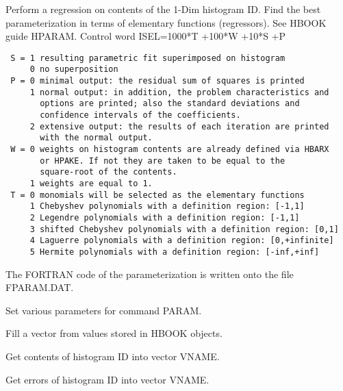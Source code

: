 \BEGARG
{}
\ENDARG
\BEGTEXT
Perform a regression on contents of the 1-Dim histogram ID.
Find the best parameterization in terms of elementary functions
(regressors). See HBOOK guide HPARAM.
Control word ISEL=1000*T +100*W +10*S +P
\begin{verbatim}
 S = 1 resulting parametric fit superimposed on histogram
     0 no superposition
 P = 0 minimal output: the residual sum of squares is printed
     1 normal output: in addition, the problem characteristics and
       options are printed; also the standard deviations and
       confidence intervals of the coefficients.
     2 extensive output: the results of each iteration are printed
       with the normal output.
 W = 0 weights on histogram contents are already defined via HBARX
       or HPAKE. If not they are taken to be equal to the
       square-root of the contents.
     1 weights are equal to 1.
 T = 0 monomials will be selected as the elementary functions
     1 Chebyshev polynomials with a definition region: [-1,1]
     2 Legendre polynomials with a definition region: [-1,1]
     3 shifted Chebyshev polynomials with a definition region: [0,1]
     4 Laguerre polynomials with a definition region: [0,+infinite]
     5 Hermite polynomials with a definition region: [-inf,+inf]
\end{verbatim}
The FORTRAN code of the parameterization is written onto the file
FPARAM.DAT.
\ENDTEXT

\BEGARG
{}
\ENDARG
\BEGTEXT
Set various parameters for command PARAM.
\ENDTEXT


\BEGTEXT
Fill a vector from values stored in HBOOK objects.
\ENDTEXT

\BEGARG
{}
\ENDARG
\BEGTEXT
Get contents of histogram ID into vector VNAME.
\ENDTEXT

\BEGARG
{}
\ENDARG
\BEGTEXT
Get errors of histogram ID into vector VNAME.
\ENDTEXT

